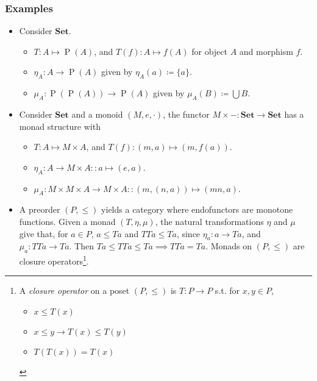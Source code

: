 \documentclass[UTF8,11pt,colorlinks,compress,openany]{beamer}%
\begin{document}
\begin{frame}\frametitle{Examples}
\begin{itemize}
	\item Consider $\mathbf{Set}$.
	\begin{itemize}
 		\item $T: A\mapsto \operatorname{P}(A)$, and $T(f): A\mapsto f(A)$ for object $A$ and morphism $f$.
 		\item $\eta_A: A\to \operatorname{P}(A)$ given by $\eta_A(a)\coloneqq \{a\}$.
 		\item $\mu_A: \operatorname{P}(\operatorname{P}(A))\to \operatorname{P}(A)$ given by $\mu_A(B)\coloneqq \bigcup B$.
	\end{itemize}
	\item Consider $\mathbf{Set}$ and a monoid $(M,e,\cdot)$, the functor $M\times -:\mathbf{Set}\to\mathbf{Set}$ has a monad structure with
	\begin{itemize}
		\item $T: A\mapsto M\times A$, and $T(f): (m,a)\mapsto (m,f(a))$.
		\item $\eta_A: A\to M\times A :: a\mapsto (e,a)$.
		\item $\mu_A: M\times M\times A\to M\times A :: (m,(n,a))\mapsto (mn,a)$.
	\end{itemize}
	\item A preorder $(P,\leq)$ yields a category where endofunctors are monotone functions. Given a monad $(T,\eta,\mu)$, the natural transformations $\eta$ and $\mu$ give that, for $a\in P$, $a\leq Ta$ and $TTa\leq Ta$, since $\eta_a: a\to Ta$, and $\mu_a: TTa\to Ta$. Then $Ta\leq TTa\leq Ta\implies TTa=Ta$. Monads on $(P,\leq)$ are closure operators\footnote{A \emph{closure operator} on a poset $(P,\leq)$ is $T: P\to P$ s.t. for $x,y\in P$,
\begin{itemize}
	\item $x\leq T(x)$
	\item $x\leq y\to T(x)\leq T(y)$
	\item $T(T(x))=T(x)$
\end{itemize}}.
\end{itemize}
\end{frame}
\end{document}
